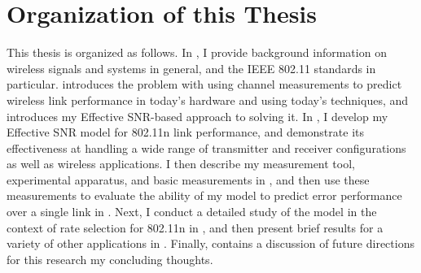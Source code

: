 \section{Organization of this Thesis}
\label{sec:intro_organization}
This thesis is organized as follows. In , I provide background information on wireless signals and systems in general, and the IEEE 802.11 standards in particular.  introduces the problem with using channel measurements to predict wireless link performance in today's hardware and using today's techniques, and introduces my Effective SNR-based approach to solving it. In , I develop my Effective SNR model for 802.11n link performance, and demonstrate its effectiveness at handling a wide range of transmitter and receiver configurations as well as wireless applications. I then describe my measurement tool, experimental apparatus, and basic measurements in , and then use these measurements to evaluate the ability of my model to predict error performance over a single link in . Next, I conduct a detailed study of the model in the context of rate selection for 802.11n in , and then present brief results for a variety of other applications in . Finally,  contains a discussion of future directions for this research my concluding thoughts.

\ifx\mainfile\undefined

\fi
